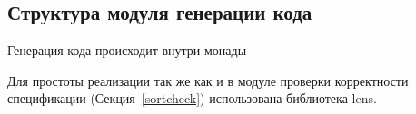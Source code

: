 \subsection{Структура модуля генерации кода}\label{repr}
Генерация кода происходит внутри монады

Для простоты реализации так же как и в модуле проверки корректности спецификации (Секция~\ref{sortcheck}) использована библиотека lens\cite{lens}.























